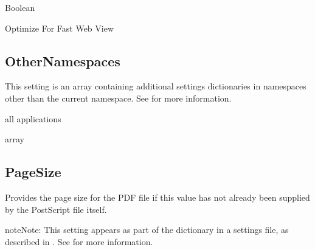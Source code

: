 \documentclass[letterpaper,12pt,english,openany,oneside]{sphinxmanual}
\begin{document}
\label{\detokenize{PDF_Create_CommonSettings:type-13}}

Boolean

\label{\detokenize{PDF_Create_CommonSettings:ui-name-10}}

Optimize For Fast Web View

\label{\detokenize{PDF_Create_CommonSettings:default-value-11}}

\begin{sphinxVerbatim}[commandchars=\\\{\}]
\end{sphinxVerbatim}




\subsection{OtherNamespaces}
\label{\detokenize{PDF_Create_CommonSettings:othernamespaces}}
This setting is an array containing additional settings dictionaries in namespaces other than the current namespace. See  for more information.

\label{\detokenize{PDF_Create_CommonSettings:supported-by-14}}

all applications

\label{\detokenize{PDF_Create_CommonSettings:type-14}}

array




\subsection{PageSize}
\label{\detokenize{PDF_Create_CommonSettings:pagesize}}
Provides the page size for the PDF file if this value has not already been supplied by the PostScript file itself.

\begin{sphinxadmonition}{note}{Note:}
This setting appears as part of the  dictionary in a settings file, as described in . See  for more information.
\end{sphinxadmonition}
\label{\detokenize{PDF_Create_CommonSettings:supported-by-15}}
\end{document}
